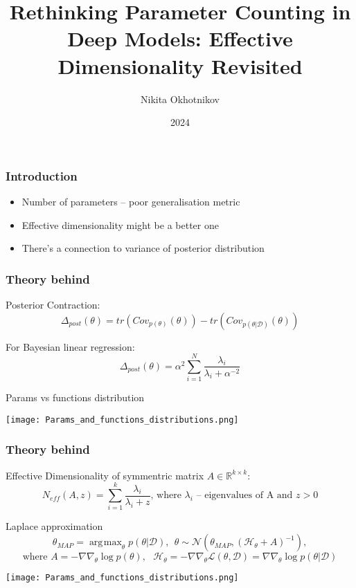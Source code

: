 \documentclass[10pt]{beamer}
\title[]{Rethinking Parameter Counting in Deep Models:
Effective Dimensionality Revisited}
\author{Nikita Okhotnikov}
\institute{MIPT}
\date{2024}
\DeclareMathOperator*{\argmax}{\arg\!\max}
\begin{document}
\begin{frame}
  \titlepage
\end{frame}


\begin{frame}
    \frametitle{Introduction}
    \begin{itemize}
        \item Number of parameters -- poor generalisation metric
        \item Effective dimensionality might be a better one
        \item There's a connection to variance of posterior distribution
    \end{itemize}
\end{frame}

\begin{frame}
    \frametitle{Theory behind}
    \begin{block}{Posterior Contraction:}
    $$\Delta_{post}(\theta) = tr(Cov_{p(\theta)}(\theta)) - tr(Cov_{p(\theta|\mathcal{D})}(\theta))$$
    \end{block}
    \begin{block}{For Bayesian linear regression:}
    \vspace{-0.2cm}
    $$\Delta_{post}(\theta) = \alpha^2\sum_{i=1}^N \frac{\lambda_i}{\lambda_i + \alpha^{-2}}$$
    \end{block}
    \vspace{-0.2cm}
    \begin{block}{Params vs functions distribution}
        \begin{center}
            \texttt{[image: Params\_and\_functions\_distributions.png]}
        \end{center}
    \end{block}
\end{frame}


\begin{frame}
    \frametitle{Theory behind}
    \begin{block}{Effective Dimensionality of symmentric matrix $A\in \mathbb{R}^{k\times k}$:}
    $$N_{eff} (A, z) = \sum_{i=1}^k \frac{\lambda_i}{\lambda_i + z} \text{, where } \lambda_i \text{ -- eigenvalues of A and } z > 0$$
    \end{block}
    \begin{block}{Laplace approximation}
    \vspace{-0.5cm}
    $$\theta_{MAP} = \argmax_\theta p(\theta|\mathcal{D}),~~\theta\sim\mathcal{N}(\theta_{MAP}, (\mathcal{H}_\theta + A)^{-1}),$$
    $$\text{where } A = -\nabla\nabla_\theta\log p(\theta),~~~ \mathcal{H}_\theta = -\nabla\nabla_\theta \mathcal{L}(\theta, \mathcal{D}) =\nabla\nabla_\theta\log p(\theta|\mathcal{D})$$
    \begin{center}
        \texttt{[image: Params\_and\_functions\_distributions.png]}
    \end{center}
    \end{block}
    
\end{frame}
\end{document}
